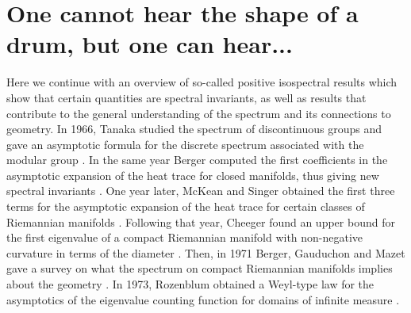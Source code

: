 \documentclass{amsart}
\theoremstyle{definition}
\begin{document}
\section{One cannot hear the shape of a drum, but one can hear...} \label{sec:Kac_positive} 
Here we continue with an overview of so-called positive isospectral results which show that certain quantities are spectral invariants, as well as results that contribute to the general understanding of the spectrum and its connections to geometry.  In 1966, Tanaka studied the spectrum of discontinuous groups and gave an asymptotic formula for the discrete spectrum associated with the modular group \cite{tanaka1966selberg}. In the same year Berger computed the first coefficients in the asymptotic expansion of the heat trace for closed manifolds, thus giving new spectral invariants \cite{berger1966sar}. One year later, McKean and Singer obtained the first three terms for the asymptotic expansion of the heat trace for certain classes of Riemannian manifolds \cite{mckean1967curvature}. Following that year, Cheeger found an upper bound for the first eigenvalue of a compact Riemannian manifold with non-negative curvature in terms of the diameter \cite{cheeger1968relation}. Then, in 1971 Berger, Gauduchon and Mazet gave a survey on what the spectrum on compact Riemannian manifolds implies about the geometry \cite{berger1971spectre}.  In 1973, Rozenblum obtained a Weyl-type law for the asymptotics of the eigenvalue counting function for domains of infinite measure \cite{rozenblum1973}. 
\end{document}
